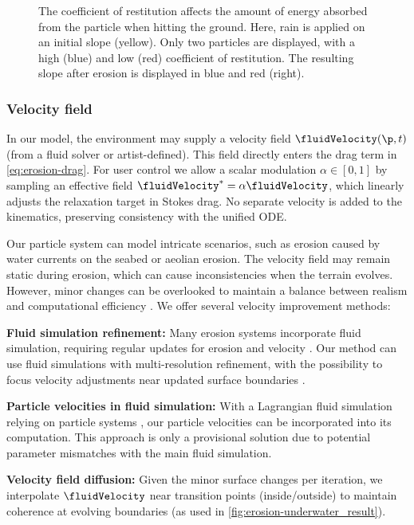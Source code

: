 \begin{figure}
    \caption{The coefficient of restitution affects the amount of energy absorbed from the particle when hitting the ground. Here, rain is applied on an initial slope (yellow). Only two particles are displayed, with a high (blue) and low (red) coefficient of restitution. The resulting slope after erosion is displayed in blue and red (right).}
    \label{fig:erosion-coefficient of restitution-diagram}
\end{figure}

\subsubsection{Velocity field}
\label{sec:erosion-velocity_field_refinement}

In our model, the environment may supply a velocity field $\fluidVelocity(\p,t)$ (from a fluid solver or artist-defined). This field directly enters the drag term in \cref{eq:erosion-drag}. For user control we allow a scalar modulation $\alpha\in[0,1]$ by sampling an effective field $\fluidVelocity^* = \alpha\fluidVelocity$, which linearly adjusts the relaxation target in Stokes drag. No separate velocity is added to the kinematics, preserving consistency with the unified ODE.

Our particle system can model intricate scenarios, such as erosion caused by water currents on the seabed or aeolian erosion. The velocity field may remain static during erosion, which can cause inconsistencies when the terrain evolves. However, minor changes can be overlooked to maintain a balance between realism and computational efficiency \cite{Tychonievich2010}. We offer several velocity improvement methods: 
\begin{Itemize}
    \Item{} \textbf{Fluid simulation refinement:} Many erosion systems incorporate fluid simulation, requiring regular updates for erosion and velocity \cite{Kristof2009, Wojtan2007}. Our method can use fluid simulations with multi-resolution refinement, with the possibility to focus velocity adjustments near updated surface boundaries \cite{Roose2011}. 
    
    \Item{} \textbf{Particle velocities in fluid simulation:} With a Lagrangian fluid simulation relying on particle systems \cite{Koschier2022}, our particle velocities can be incorporated into its computation. This approach is only a provisional solution due to potential parameter mismatches with the main fluid simulation. 

    \Item{} \textbf{Velocity field diffusion:} Given the minor surface changes per iteration, we interpolate $\fluidVelocity$ near transition points (inside/outside) to maintain coherence at evolving boundaries (as used in \cref{fig:erosion-underwater_result}).
\end{Itemize}

